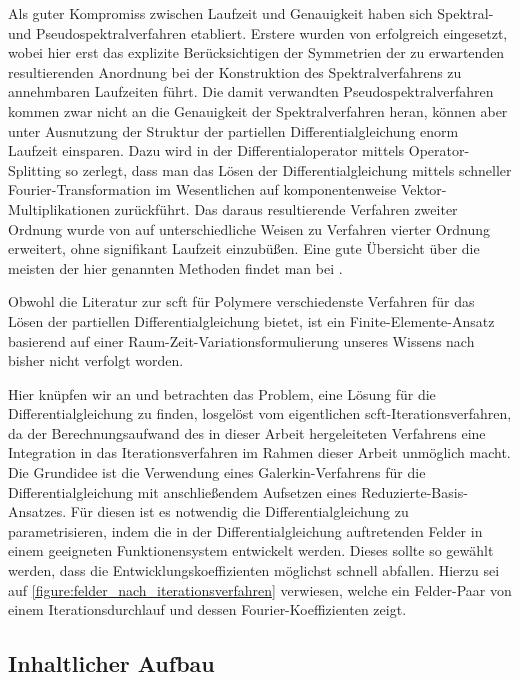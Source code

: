 \documentclass[../main.tex]{subfiles}
\begin{document}
Als guter Kompromiss zwischen Laufzeit und Genauigkeit haben sich Spektral- und Pseudospektralverfahren etabliert.
Erstere wurden von \textcite{Matsen:1994bz} erfolgreich eingesetzt, wobei hier erst das explizite Berücksichtigen der Symmetrien der zu erwartenden resultierenden Anordnung bei der Konstruktion des Spektralverfahrens zu annehmbaren Laufzeiten führt.
Die damit verwandten Pseudospektralverfahren kommen zwar nicht an die Genauigkeit der Spektralverfahren heran, können aber unter Ausnutzung der Struktur der partiellen Differentialgleichung enorm Laufzeit einsparen.
Dazu wird in \cite{Rasmussen:2002kt} der Differentialoperator mittels Operator-Splitting so zerlegt, dass man das Lösen der Differentialgleichung mittels schneller Fourier-Transformation im Wesentlichen auf komponentenweise Vektor-Multiplikationen zurückführt.
Das daraus resultierende Verfahren zweiter Ordnung wurde von \cite{GarciaCervera:2006uu,Ranjan:2007kl} auf unterschiedliche Weisen zu Verfahren vierter Ordnung erweitert, ohne signifikant Laufzeit einzubüßen.
Eine gute Übersicht über die meisten der hier genannten Methoden findet man bei \textcites[Section 3.6]{Fredrickson:2006th}{Audus:2013ep}.

Obwohl die Literatur zur \ac{scft} für Polymere verschiedenste Verfahren für das Lösen der partiellen Differentialgleichung bietet, ist ein Finite-Elemente-Ansatz basierend auf einer Raum-Zeit-Variationsformulierung unseres Wissens nach bisher nicht verfolgt worden.

Hier knüpfen wir an und betrachten das Problem, eine Lösung für die Differentialgleichung zu finden, losgelöst vom eigentlichen \ac{scft}-Iterationsverfahren, da der Berechnungsaufwand des in dieser Arbeit hergeleiteten Verfahrens eine Integration in das Iterationsverfahren im Rahmen dieser Arbeit unmöglich macht.
Die Grundidee ist die Verwendung eines Galerkin-Verfahrens für die Differentialgleichung mit anschließendem Aufsetzen eines Reduzierte-Basis-Ansatzes.
Für diesen ist es notwendig die Differentialgleichung zu parametrisieren, indem die in der Differentialgleichung auftretenden Felder in einem geeigneten Funktionensystem entwickelt werden.
Dieses sollte so gewählt werden, dass die Entwicklungskoeffizienten möglichst schnell abfallen.
Hierzu sei auf \cref{figure:felder_nach_iterationsverfahren} verwiesen, welche ein Felder-Paar von einem Iterationsdurchlauf und dessen Fourier-Koeffizienten zeigt.


\subsection*{Inhaltlicher Aufbau}
\end{document}
